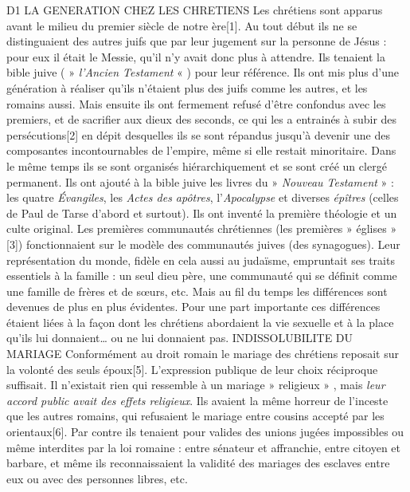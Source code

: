 D1 LA GENERATION CHEZ LES CHRETIENS 
 Les chrétiens sont apparus avant le milieu du premier siècle de notre ère[1]. Au tout début ils ne se distinguaient des autres juifs que par leur jugement sur la personne de Jésus : pour eux il était le Messie, qu'il n'y avait donc plus à attendre. Ils tenaient la bible juive ( » \emph{l'Ancien Testament} « ) pour leur référence. Ils ont mis plus d'une génération à réaliser qu'ils n'étaient plus des juifs comme les autres, et les romains aussi. Mais ensuite ils ont fermement refusé d'être confondus avec les premiers, et de sacrifier aux dieux des seconds, ce qui les a entrainés à subir des persécutions[2] en dépit desquelles ils se sont répandus jusqu'à devenir une des composantes incontournables de l'empire, même si elle restait minoritaire. 
 Dans le même temps ils se sont organisés hiérarchiquement et se sont créé un clergé permanent. Ils ont ajouté à la bible juive les livres du » \emph{Nouveau Testament} » : les quatre \emph{Évangiles}, les \emph{Actes des apôtres}, l'\emph{Apocalypse} et diverses \emph{épîtres} (celles de Paul de Tarse d'abord et surtout). Ils ont inventé la première théologie et un culte original. 
 Les premières communautés chrétiennes (les premières » églises » [3]) fonctionnaient sur le modèle des communautés juives (des synagogues). Leur représentation du monde, fidèle en cela aussi au judaïsme, empruntait ses traits essentiels à la famille : un seul dieu père, une communauté qui se définit comme une famille de frères et de sœurs, etc. Mais au fil du temps les différences sont devenues de plus en plus évidentes. Pour une part importante ces différences étaient liées à la façon dont les chrétiens abordaient la vie sexuelle et à la place qu'ils lui donnaient… ou ne lui donnaient pas. 
INDISSOLUBILITE DU MARIAGE
 Conformément au droit romain le mariage des chrétiens reposait sur la volonté des seuls époux[5]. L'expression publique de leur choix réciproque suffisait. Il n'existait rien qui ressemble à un mariage » religieux » , mais \emph{leur accord public avait des effets religieux}. Ils avaient la même horreur de l'inceste que les autres romains, qui refusaient le mariage entre cousins accepté par les orientaux[6]. Par contre ils tenaient pour valides des unions jugées impossibles ou même interdites par la loi romaine : entre sénateur et affranchie, entre citoyen et barbare, et même ils reconnaissaient la validité des mariages des esclaves entre eux ou avec des personnes libres, etc.

